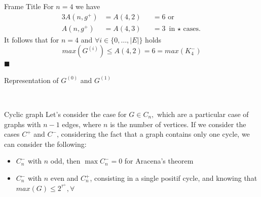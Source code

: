 \documentclass{beamer}
\begin{document}
\begin{frame}{Frame Title}
    For $n=4$ we have
    \vspace{-0.5em}
    \begin{alignat*}{3}
        A(n,g^+) &= A(4,2) &&= 6 \text{ or }\\
        A(n,g^+) &= A(4,3) &&= 3 \text{ in $\star$ cases.}
    \end{alignat*}
    It follows that for $n=4$ and $\forall i \in \{0,\dots,|E|\}$ holds
    \[
        max(G^{(i)}) \leq A(4,2) = 6 = max(K_4^-)
    \]
    \hfill $\blacksquare$
\end{frame}

\begin{frame}{Representation of $G^{(0)}$ and $G^{(1)}$}
    \begin{figure}
    	\centering
    	\ \ \ \ 
    	\label{fig:comparison}
    \end{figure}
\end{frame}

\begin{frame}{Cyclic graph}
    Let's consider the case for $G \in C_n,$ which are a particular case of graphs with $n-1$ edges, where $n$ is the number of vertices. If we consider the cases $C^+$ and $C^-$, considering the fact that a graph contains only one cycle, we can consider the following:
    \begin{itemize}
        \item $C_n^-$ with $n$ odd, then $\max{C_n^-}=0$ for Aracena's theorem 
        \item $C_n^-$ with $n$ even and $C_n^+$, consisting in a single positif cycle, and knowing that $max(G) \leq 2^{\tau^+}, \forall $
    \end{itemize}
\end{frame}
\end{document}
